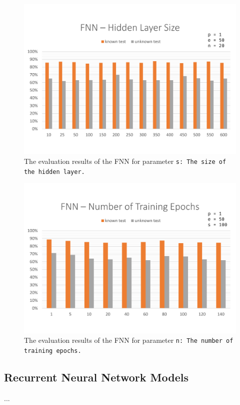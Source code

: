 \begin{figure}[H]
	\includegraphics[width=\textwidth]{images/evaluation_fnn_s}
	\caption[FNN Evaluation: Hidden Layer Size]{The evaluation results of the FNN for parameter \tt{s}: The size of the hidden layer.}
	\label{f.evaluation.fnn.s}
\end{figure}

\begin{figure}[H]
	\includegraphics[width=\textwidth]{images/evaluation_fnn_n}
	\caption[FNN Evaluation: Number of Training Epochs]{The evaluation results of the FNN for parameter \tt{n}: The number of training epochs.}
	\label{f.evaluation.fnn.n}
\end{figure}

\subsection{Recurrent Neural Network Models}\label{c.evaluation.results.rnn}
...

